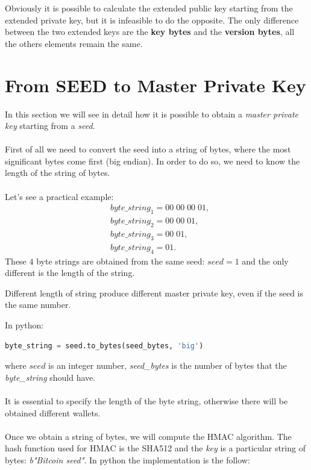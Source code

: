 \begin{remark}
	Obviously it is possible to calculate the extended public key starting from the extended private key, but it is infeasible to do the opposite. The only difference between the two extended keys are the \textbf{key bytes} and the \textbf{version bytes}, all the others elements remain the same.
\end{remark}

\section{From SEED to Master Private Key}
In this section we will see in detail how it is possible to obtain a \textit{master private key} starting from a \textit{seed}.
\\ \\
First of all we need to convert the seed into a string of bytes, where the most significant bytes come first (big endian). In order to do so, we need to know the length of the string of bytes. \\ \\
Let's see a practical example:
\begin{equation*}
\begin{split}
&byte\_string_1=00\; 00\; 00 \; 01, \\
&byte\_string_2=00\; 00\; 01, \\
&byte\_string_3=00\; 01, \\
&byte\_string_4=01.
\end{split}
\end{equation*}
These $4$ byte strings are obtained from the same seed: $seed=1$ and the only different is the length of the string.
\begin{remark}
	Different length of string produce different master private key, even if the seed is the same number.
\end{remark}
In python:
\begin{lstlisting}[language=Python]
byte_string = seed.to_bytes(seed_bytes, 'big')
\end{lstlisting}
where $seed$ is an integer number, \textit{seed\_bytes} is the number of bytes that the \textit{byte\_string} should have. 
\\ \\
It is essential to specify the length of the byte string, otherwise there will be obtained different wallets. \\ \\
Once we obtain a string of bytes, we will compute the HMAC algorithm. The hash function used for HMAC is the SHA512 and the \textit{key} is a particular string of bytes: \textit{b"Bitcoin seed"}. In python the implementation is the follow:

